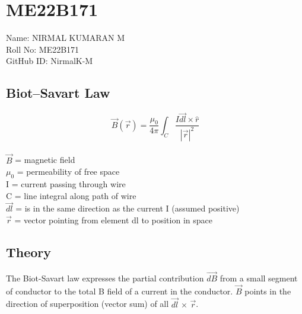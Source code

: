 



%

\pagebreak

\section{ME22B171}
Name: NIRMAL KUMARAN M \\
Roll No: ME22B171 \\
GitHub ID: NirmalK-M

\subsection{\textbf{Biot–Savart Law}}

\begin{equation}
	\vec{B}(\vec{r})= \frac{\mu_{0}}{4\pi} \int_{C}{\frac{{I\vec{dl}}\times {\hat{r}}}{|\vec{r}|^{2}}} 
\end{equation} \\
\(\vec{B}\) = magnetic field \\ 
\(\mu_{0}\) = permeability of free space \\ 
I = current passing through wire  \\ 
C = line integral along path of wire \\
\(\vec{dl}\) = is in the same direction as the current I (assumed positive)\\ 
\(\vec{r}\) = vector pointing from element dl to position in space 

\subsection{Theory}
\quad The Biot-Savart law expresses the partial contribution $\vec{dB}$ from a small segment of conductor to the total B field of a current in the conductor. $\vec{B}$ points in the direction of superposition (vector sum) of all $\vec{dl}$ $\times$ $\vec{r}$. 

